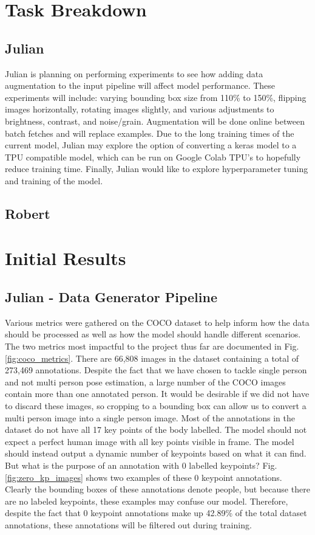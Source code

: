 \documentclass[11pt, letterpaper]{article}
\begin{document}
\section{Task Breakdown}

\subsection{Julian}
Julian is planning on performing experiments to see how adding data augmentation to the input pipeline will affect model performance. These experiments will include: varying bounding box size from 110\% to 150\%, flipping images horizontally, rotating images slightly, and various adjustments to brightness, contrast, and noise/grain. Augmentation will be done online between batch fetches and will replace examples. Due to the long training times of the current model, Julian may explore the option of converting a keras model to a TPU compatible model, which can be run on Google Colab TPU’s to hopefully reduce training time. Finally, Julian would like to explore hyperparameter tuning and training of the model.

\subsection{Robert}

\section{Initial Results}

\subsection{Julian - Data Generator Pipeline}

Various metrics were gathered on the COCO dataset to help inform how the data should be processed as well as how the model should handle different scenarios. The two metrics most impactful to the project thus far are documented in Fig. \ref{fig:coco_metrics}. There are 66,808 images in the dataset containing a total of 273,469 annotations. Despite the fact that we have chosen to tackle single person and not multi person pose estimation, a large number of the COCO images contain more than one annotated person. It would be desirable if we did not have to discard these images, so cropping to a bounding box can allow us to convert a multi person image into a single person image. Most of the annotations in the dataset do not have all 17 key points of the body labelled. The model should not expect a perfect human image with all key points visible in frame. The model should instead output a dynamic number of keypoints based on what it can find. But what is the purpose of an annotation with 0 labelled keypoints? Fig. \ref{fig:zero_kp_images} shows two examples of these 0 keypoint annotations. Clearly the bounding boxes of these annotations denote people, but because there are no labeled keypoints, these examples may confuse our model. Therefore, despite the fact that 0 keypoint annotations make up 42.89\% of the total dataset annotations, these annotations will be filtered out during training.
\end{document}
